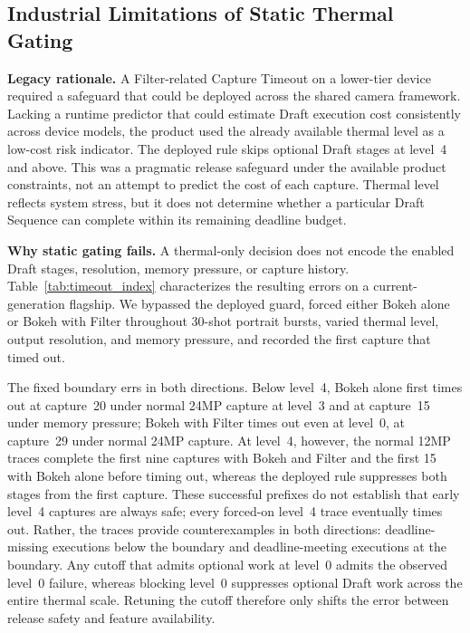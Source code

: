 \subsection{Industrial Limitations of Static Thermal Gating}
\label{sec:guard-limit}

\smallskip\noindent\textbf{Legacy rationale.}
A Filter-related Capture Timeout on a lower-tier device required a safeguard
that could be deployed across the shared camera framework. Lacking a runtime
predictor that could estimate Draft execution cost consistently across device
models, the product used the already available thermal level as a low-cost risk
indicator. The deployed rule skips optional Draft stages at level~4 and above.
This was a pragmatic release safeguard under the available product constraints,
not an attempt to predict the cost of each capture. Thermal level reflects
system stress, but it does not determine whether a particular Draft Sequence
can complete within its remaining deadline budget.

\smallskip\noindent\textbf{Why static gating fails.}
A thermal-only decision does not encode the enabled Draft stages, resolution,
memory pressure, or capture history. Table~\ref{tab:timeout_index}
characterizes the resulting errors on a current-generation flagship. We
bypassed the deployed guard, forced either Bokeh alone or Bokeh with Filter
throughout 30-shot portrait bursts, varied thermal level, output resolution,
and memory pressure, and recorded the first capture that timed out.



The fixed boundary errs in both directions. Below level~4, Bokeh alone first
times out at capture~20 under normal 24MP capture at level~3 and at capture~15
under memory pressure; Bokeh with Filter times out even at level~0, at
capture~29 under normal 24MP capture. At level~4, however, the normal 12MP
traces complete the first nine captures with Bokeh and Filter and the first 15
with Bokeh alone before timing out, whereas the deployed rule suppresses both
stages from the first capture. These successful prefixes do not establish that
early level~4 captures are always safe; every forced-on level~4 trace eventually
times out. Rather, the traces provide counterexamples in both directions:
deadline-missing executions below the boundary and deadline-meeting executions
at the boundary. Any cutoff that admits optional work at level~0 admits the
observed level~0 failure, whereas blocking level~0 suppresses optional Draft
work across the entire thermal scale. Retuning the cutoff therefore only shifts
the error between release safety and feature availability.

